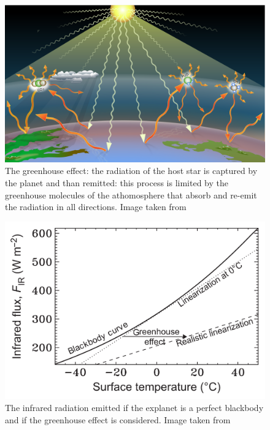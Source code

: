 \documentclass[
12pt, %
a4paper, %
oneside, %
headinclude,footinclude, %
BCOR5mm, %
]{scrartcl}
\begin{document}
\begin{figure}[h]
\begin{center}
\includegraphics[width=1\textwidth]{Pic/Greenhouse-effect-t2.png}
\caption{The greenhouse effect: the radiation of the host star is captured by the planet and than remitted: this process is limited by the greenhouse molecules of the athomosphere that absorb and re-emit the radiation in all directions. Image taken from \cite{Greenhouse-effect-t2}}
\label{Greenhouse-effect-t2}
\end{center}
\end{figure}

\begin{figure}[h]
\begin{center}
\includegraphics[width=1\textwidth]{Pic/BlackBody_greenhouse.png}
\caption{The infrared radiation emitted if the explanet is a perfect blackbody and if the greenhouse effect is considered. Image taken from \cite{catling2017atmospheric}}
\label{BlackBody_greenhouse}
\end{center}
\end{figure}
\end{document}
